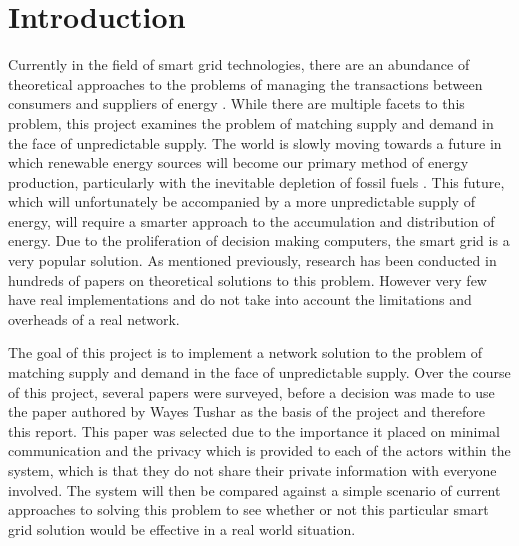 \documentclass[a4paper, notitlepage]{report}
\author{Brian McNestry}
\date{\today}
\title{}
\begin{document}
\inserttitlepage


\declaration

\permissiontolend

\insertabstract

\acknowledgements

\tableofcontents

\newpage


\part{Introduction}
\label{sec:org147092e}
Currently in the field of smart grid technologies, there are an abundance of
theoretical approaches to the problems of managing the transactions between
consumers and suppliers of energy \cite{ambrosio2016transactive}. While there are
multiple facets to this problem, this project examines the problem of matching
supply and demand in the face of unpredictable supply. The world is slowly
moving towards a future in which renewable energy sources will become our
primary method of energy production, particularly with the inevitable depletion
of fossil fuels \cite{boyle1997renewable}. This future, which will unfortunately
be accompanied by a more unpredictable supply of energy, will require a smarter
approach to the accumulation and distribution of energy. Due to the
proliferation of decision making computers, the smart grid is a very popular
solution. As mentioned previously, research has been conducted in hundreds of
papers on theoretical solutions to this problem. However very few have real
implementations and do not take into account the limitations and overheads of a
real network.

The goal of this project is to implement a network solution to the problem of
matching supply and demand in the face of unpredictable supply. Over the course
of this project, several papers were surveyed, before a decision was made to use
the paper authored by Wayes Tushar \cite{tushar2014prioritizing} as the basis of
the project and therefore this report. This paper was selected due to the
importance it placed on minimal communication and the privacy which is provided
to each of the actors within the system, which is that they do not share their
private information with everyone involved. The system will then be compared
against a simple scenario of current approaches to solving this problem to see
whether or not this particular smart grid solution would be effective in a real
world situation.
\end{document}
